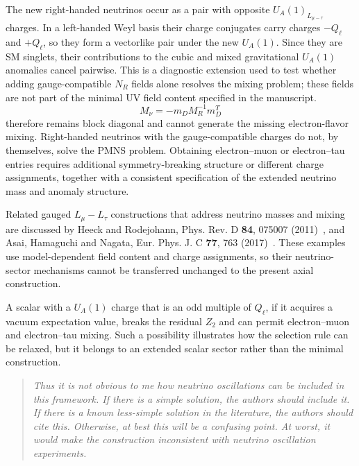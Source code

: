 \documentclass[12pt,a4paper]{article}
\begin{document}
The new right-handed neutrinos occur as a pair with opposite \(U_A(1)_{L_{\mu-\tau}}\) charges. In a left-handed Weyl basis their charge conjugates carry charges \(-Q_\ell\) and \(+Q_\ell\), so they form a vectorlike pair under the new \(U_A(1)\). Since they are SM singlets, their contributions to the cubic and mixed gravitational \(U_A(1)\) anomalies cancel pairwise. This is a diagnostic extension used to test whether adding gauge-compatible \(N_R\) fields alone resolves the mixing problem; these fields are not part of the minimal UV field content specified in the manuscript.
\[
M_\nu=-m_D M_R^{-1}m_D^T
\]
therefore remains block diagonal and cannot generate the missing electron-flavor mixing. Right-handed neutrinos with the gauge-compatible charges do not, by themselves, solve the PMNS problem. Obtaining electron--muon or electron--tau entries requires additional symmetry-breaking structure or different charge assignments, together with a consistent specification of the extended neutrino mass and anomaly structure.

Related gauged \(L_\mu-L_\tau\) constructions that address neutrino masses and mixing are discussed by Heeck and Rodejohann, Phys. Rev. D \textbf{84}, 075007 (2011)~\cite{Heeck:2011wj}, and Asai, Hamaguchi and Nagata, Eur. Phys. J. C \textbf{77}, 763 (2017)~\cite{Asai:2017ryy}. These examples use model-dependent field content and charge assignments, so their neutrino-sector mechanisms cannot be transferred unchanged to the present axial construction.

A scalar with a \(U_A(1)\) charge that is an odd multiple of \(Q_\ell\), if it acquires a vacuum expectation value, breaks the residual \(Z_2\) and can permit electron--muon and electron--tau mixing. Such a possibility illustrates how the selection rule can be relaxed, but it belongs to an extended scalar sector rather than the minimal construction.

\medskip
{}

\begin{quote}\itshape
Thus it is not obvious to me how neutrino oscillations can be included in this framework. If there is a simple solution, the authors should include it. If there is a known less-simple solution in the literature, the authors should cite this. Otherwise, at best this will be a confusing point. At worst, it would make the construction inconsistent with neutrino oscillation experiments.
\end{quote}
\end{document}
